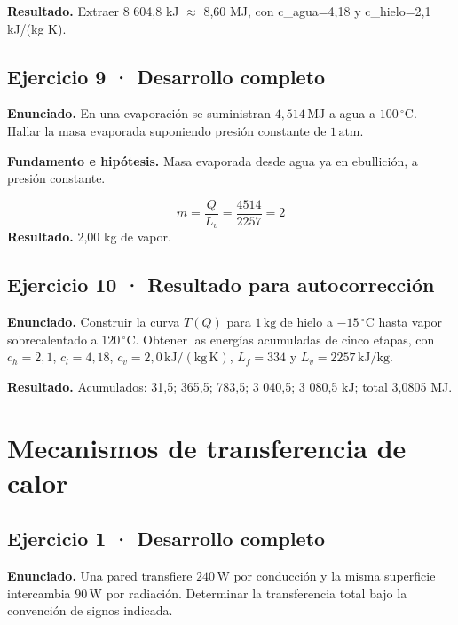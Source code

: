 \documentclass[11pt,a4paper]{article}
\begin{document}
\textbf{Resultado.} Extraer 8 604,8 kJ \ensuremath{\approx} 8,60 MJ, con c\_agua=4,18 y c\_hielo=2,1 kJ/(kg K).


\subsection*{Ejercicio 9 · Desarrollo completo}
\textbf{Enunciado.} En una evaporación se suministran \(4{,}514\,\mathrm{MJ}\) a agua a \(100\,^\circ\mathrm C\). Hallar la masa evaporada suponiendo presión constante de \(1\,\mathrm{atm}\).

\textbf{Fundamento e hipótesis.} Masa evaporada desde agua ya en ebullición, a presión constante.

\[
m=\frac{Q}{L_v}=\frac{4514}{2257}=2
\]
\textbf{Resultado.} 2,00 kg de vapor.


\subsection*{Ejercicio 10 · Resultado para autocorrección}
\textbf{Enunciado.} Construir la curva \(T(Q)\) para \(1\,\mathrm{kg}\) de hielo a \(-15\,^\circ\mathrm C\) hasta vapor sobrecalentado a \(120\,^\circ\mathrm C\). Obtener las energías acumuladas de cinco etapas, con \(c_h=2{,}1\), \(c_l=4{,}18\), \(c_v=2{,}0\,\mathrm{kJ/(kg\,K)}\), \(L_f=334\) y \(L_v=2257\,\mathrm{kJ/kg}\).

\textbf{Resultado.} Acumulados: 31,5; 365,5; 783,5; 3 040,5; 3 080,5 kJ; total 3,0805 MJ.


\clearpage

\section{Mecanismos de transferencia de calor}

\begin{center}\end{center}

\subsection*{Ejercicio 1 · Desarrollo completo}
\textbf{Enunciado.} Una pared transfiere \(240\,\mathrm W\) por conducción y la misma superficie intercambia \(90\,\mathrm W\) por radiación. Determinar la transferencia total bajo la convención de signos indicada.
\end{document}
